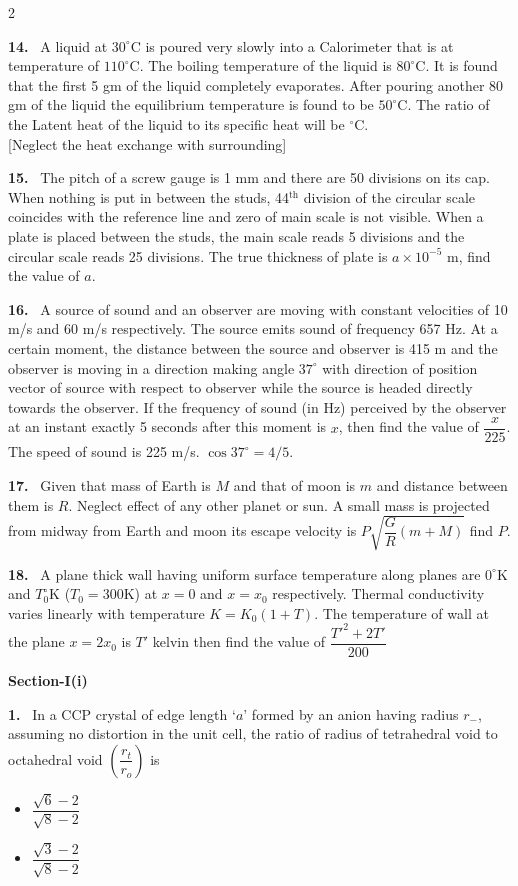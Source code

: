 \documentclass[10pt]{extarticle}
\newcommand{\partsec}[2]{\par\medskip\noindent{\large\bfseries PART-#1: #2}\par\smallskip}
\newcommand{\sect}[1]{\par\smallskip\noindent\textbf{#1}\par}
\newcommand{\qn}[1]{\par\smallskip\noindent\textbf{#1.}~}
\newenvironment{qoptions}{\begin{itemize}[leftmargin=1.8em,itemsep=1pt,topsep=2pt,label={}]}{\end{itemize}}
\newcommand{\opt}[2]{\item[(#1)] #2}
\begin{document}
\begin{multicols}{2}
\qn{14} A liquid at $30^\circ$C is poured very slowly into a Calorimeter that is at temperature of $110^\circ$C. The boiling temperature of the liquid is $80^\circ$C. It is found that the first 5 gm of the liquid completely evaporates. After pouring another 80 gm of the liquid the equilibrium temperature is found to be $50^\circ$C. The ratio of the Latent heat of the liquid to its specific heat will be \underline{\hspace{1.2cm}}$^\circ$C.\\
{[}Neglect the heat exchange with surrounding{]}
\qn{15} The pitch of a screw gauge is 1 mm and there are 50 divisions on its cap. When nothing is put in between the studs, 44$^{\text{th}}$ division of the circular scale coincides with the reference line and zero of main scale is not visible. When a plate is placed between the studs, the main scale reads 5 divisions and the circular scale reads 25 divisions. The true thickness of plate is $a\times10^{-5}$ m, find the value of $a$.
\qn{16} A source of sound and an observer are moving with constant velocities of 10 m/s and 60 m/s respectively. The source emits sound of frequency 657 Hz. At a certain moment, the distance between the source and observer is 415 m and the observer is moving in a direction making angle $37^\circ$ with direction of position vector of source with respect to observer while the source is headed directly towards the observer. If the frequency of sound (in Hz) perceived by the observer at an instant exactly 5 seconds after this moment is $x$, then find the value of $\dfrac{x}{225}$. The speed of sound is 225 m/s. $\cos37^\circ=4/5$.
\qn{17} Given that mass of Earth is $M$ and that of moon is $m$ and distance between them is $R$. Neglect effect of any other planet or sun. A small mass is projected from midway from Earth and moon its escape velocity is $P\sqrt{\dfrac GR(m+M)}$ find $P$.
\qn{18} A plane thick wall having uniform surface temperature along planes are $0^\circ$K and $T_0^\circ$K ($T_0=300$K) at $x=0$ and $x=x_0$ respectively. Thermal conductivity varies linearly with temperature $K=K_0(1+T)$. The temperature of wall at the plane $x=2x_0$ is $T'$ kelvin then find the value of $\dfrac{T'^2+2T'}{200}$
\partsec{2}{CHEMISTRY}
\sect{Section-I(i)}
\qn{1} In a CCP crystal of edge length `$a$' formed by an anion having radius $r_-$, assuming no distortion in the unit cell, the ratio of radius of tetrahedral void to octahedral void $\left(\dfrac{r_t}{r_o}\right)$ is
\begin{qoptions}
\opt{A}{$\dfrac{\sqrt6-2}{\sqrt8-2}$}
\opt{B}{$\dfrac{\sqrt3-2}{\sqrt8-2}$}

\end{qoptions}
\end{multicols}
\end{document}
